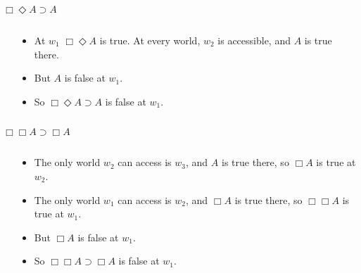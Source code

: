 \documentclass[
  14pt,
  letterpaper,
  ignorenonframetext,
  aspectratio=169,
]{beamer}
\begin{document}
\begin{frame}{\(\Box \Diamond A \supset A\)}
\protect\hypertarget{box-diamond-a-supset-a}{}
\begin{columns}
    \begin{column}{0.45\textwidth}
    \end{column}
    \begin{column}{0.5\textwidth}
    \begin{itemize}
    \item At $w_1$ $\Box \Diamond A$ is true. At every world, $w_2$ is accessible, and $A$ is true there.
    \item But $A$ is false at $w_1$.
    \item So $\Box \Diamond A \supset A$ is false at $w_1$.
    \end{itemize}
  \end{column}
\end{columns}
\end{frame}

\begin{frame}{\(\Box \Box A \supset \Box A\)}
\protect\hypertarget{box-box-a-supset-box-a}{}
\begin{columns}
    \begin{column}{0.45\textwidth}
    \end{column}
    \begin{column}{0.5\textwidth}
    \begin{itemize}
    \item The only world $w_2$ can access is $w_3$, and $A$ is true there, so $\Box A$ is true at $w_2$.
    \item The only world $w_1$ can access is $w_2$, and $\Box A$ is true there, so $\Box \Box A$ is true at $w_1$.
    \item But $\Box A$ is false at $w_1$.
    \item So $\Box \Box A \supset \Box A$ is false at $w_1$.
    \end{itemize}
  \end{column}
\end{columns}
\end{frame}
\end{document}
